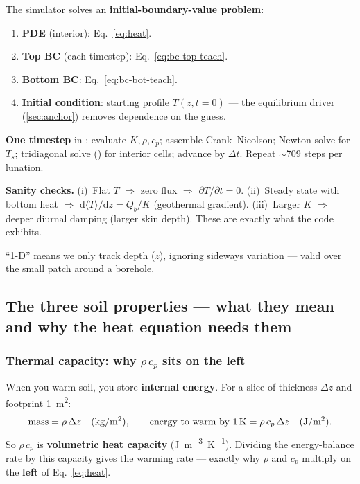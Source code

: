 The simulator solves an \textbf{initial-boundary-value problem}:
\begin{enumerate}[leftmargin=1.5em,itemsep=3pt]
  \item \textbf{PDE} (interior): Eq.~\eqref{eq:heat}.
  \item \textbf{Top BC} (each timestep): Eq.~\eqref{eq:bc-top-teach}.
  \item \textbf{Bottom BC}: Eq.~\eqref{eq:bc-bot-teach}.
  \item \textbf{Initial condition}: starting profile $T(z,t{=}0)$ --- the
    equilibrium driver (\autoref{sec:anchor}) removes dependence on the guess.
\end{enumerate}

\textbf{One timestep} in : evaluate $K,\rho,c_p$; assemble
Crank--Nicolson; Newton solve for $T_s$; tridiagonal solve () for
interior cells; advance by $\Delta t$. Repeat $\sim$709 steps per lunation.

\begin{headsup}
\textbf{Sanity checks.} (i)~Flat $T$ $\Rightarrow$ zero flux $\Rightarrow$
$\partial T/\partial t = 0$. (ii)~Steady state with bottom heat $\Rightarrow$
$\mathrm{d}\langle T\rangle/\mathrm{d}z = Q_b/K$ (geothermal gradient).
(iii)~Larger $K$ $\Rightarrow$ deeper diurnal damping (larger skin depth).
These are exactly what the code exhibits.
\end{headsup}

``1-D'' means we only track depth ($z$), ignoring sideways variation --- valid
over the small patch around a borehole.

\subsection{The three soil properties --- what they mean and why the heat equation needs them}
\label{sec:properties}

\subsubsection{Thermal capacity: why $\rho\,c_p$ sits on the left}

When you warm soil, you store \textbf{internal energy}. For a slice of thickness
$\Delta z$ and footprint \SI{1}{m^2}:
\[
  \text{mass} = \rho\,\Delta z \quad (\si{kg/m^2}), \qquad
  \text{energy to warm by \SI{1}{\kelvin}} = \rho\,c_p\,\Delta z \quad (\si{J/m^2}).
\]
So $\rho\,c_p$ is \textbf{volumetric heat capacity} (\si{J.m^{-3}.K^{-1}}). Dividing
the energy-balance rate by this capacity gives the warming rate --- exactly why
$\rho$ and $c_p$ multiply on the \textbf{left} of Eq.~\eqref{eq:heat}.

